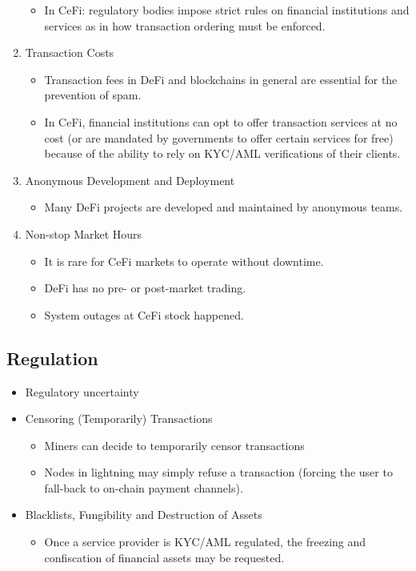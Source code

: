 \begin{enumerate}
\begin{itemize}
    \item In CeFi: regulatory bodies impose strict rules on financial institutions and services as in how transaction ordering must be enforced.
  \end{itemize}
  \item Transaction Costs
  \begin{itemize}
    \item Transaction fees in DeFi and blockchains in general are essential for the prevention of spam.
    \item In CeFi, financial institutions can opt to offer transaction services at no cost (or are mandated by governments to offer certain services for free) because of the ability to rely on KYC/AML verifications of their clients.
  \end{itemize}
  \item Anonymous Development and Deployment
  \begin{itemize}
    \item Many DeFi projects are developed and maintained by anonymous teams.
  \end{itemize}
  \item Non-stop Market Hours
  \begin{itemize}
    \item It is rare for CeFi markets to operate without downtime.
    \item DeFi has no pre- or post-market trading.
    \item System outages at CeFi stock happened.
  \end{itemize}
\end{enumerate}

\subsection{Regulation}
\begin{itemize}
  \item Regulatory uncertainty
  \item Censoring (Temporarily) Transactions
  \begin{itemize}
    \item Miners can decide to temporarily censor transactions
    \item Nodes in lightning may simply refuse a transaction (forcing the user to fall-back to on-chain payment channels).
  \end{itemize}
  \item Blacklists, Fungibility and Destruction of Assets
  \begin{itemize}
    \item Once a service provider is KYC/AML regulated, the freezing and confiscation of financial assets may be requested.
  \end{itemize}
\end{itemize}

